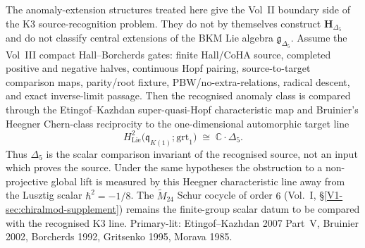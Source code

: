 \begin{remark}
\label{rem:anom-ext-1}
The anomaly-extension structures treated here give the Vol~II boundary
side of the K3 source-recognition problem.  They do not by themselves
construct $\mathbf H_{\Delta_5}$ and do not classify central extensions
of the BKM Lie algebra $\mathfrak g_{\Delta_5}$.  Assume the Vol~III
compact Hall--Borcherds gates: finite Hall/CoHA source, completed
positive and negative halves, continuous Hopf pairing, source-to-target
comparison maps, parity/root fixture, PBW/no-extra-relations, radical
descent, and exact inverse-limit passage.  Then the recognised anomaly
class is compared through the Etingof--Kazhdan super-quasi-Hopf
characteristic map and Bruinier's Heegner Chern-class reciprocity to the
one-dimensional automorphic target line
\[
H^2_{\mathrm{Lie}}\bigl(\mathfrak q_{K(1)};\mathrm{grt}_1\bigr)
\;\cong\; \mathbb C\cdot \Delta_5 .
\]
Thus $\Delta_5$ is the scalar comparison invariant of the recognised
source, not an input which proves the source.  Under the same hypotheses
the obstruction to a non-projective global lift is measured by this
Heegner characteristic line away from the Lusztig scalar
$\hbar^2=-1/8$.  The $\widetilde M_{24}$ Schur cocycle of order $6$
(Vol.~I, \S\ref{V1-sec:chiralmod-supplement}) remains the finite-group
scalar datum to be compared with the recognised K3 line.  Primary-lit:
Etingof--Kazhdan 2007 Part~V, Bruinier 2002, Borcherds 1992,
Gritsenko 1995, Morava 1985.
\end{remark}
